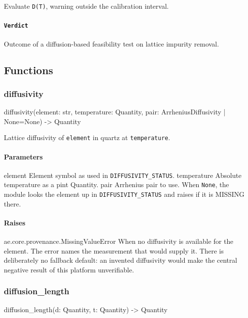 \documentclass[10pt,a4paper,twoside]{report}
\begin{document}
Evaluate \texttt{D(T)}, warning outside the calibration interval.

\paragraph{\texttt{Verdict}}

Outcome of a diffusion-based feasibility test on lattice impurity removal.

\subsection*{Functions}

\subsubsection*{diffusivity}

\begin{verbatimsmall}
diffusivity(element: str, temperature: Quantity, pair: ArrheniusDiffusivity | None=None) -> Quantity
\end{verbatimsmall}

Lattice diffusivity of \texttt{element} in quartz at \texttt{temperature}.

\paragraph*{Parameters}

element Element symbol as used in \texttt{DIFFUSIVITY\_STATUS}. temperature Absolute temperature as a pint Quantity. pair Arrhenius pair to use. When \texttt{None}, the module looks the element up in \texttt{DIFFUSIVITY\_STATUS} and raises if it is MISSING there.

\paragraph*{Raises}

ae.core.provenance.MissingValueError When no diffusivity is available for the element. The error names the measurement that would supply it. There is deliberately no fallback default: an invented diffusivity would make the central negative result of this platform unverifiable.

\subsubsection*{diffusion\_length}

\begin{verbatimsmall}
diffusion_length(d: Quantity, t: Quantity) -> Quantity
\end{verbatimsmall}
\end{document}
